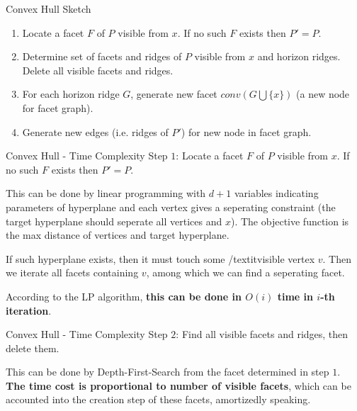 \documentclass{beamer}
\begin{document}
\begin{frame}{Convex Hull Sketch}
	\begin{enumerate}
		\item Locate a facet $F$ of $P$ visible from $x$. If no such $F$ exists then $P' = P$.
		\item Determine set of facets and ridges of $P$ visible from $x$ and horizon ridges.
		      Delete all visible facets and ridges.
		\item For each horizon ridge $G$, generate new facet $conv(G \bigcup \{ x \})$ (a new node for facet graph).
		\item Generate new edges (i.e. ridges of $P'$) for new node in facet graph.
	\end{enumerate}
\end{frame}
\begin{frame}{Convex Hull - Time Complexity}
	Step $1$: Locate a facet $F$ of $P$ visible from $x$. If no such $F$ exists then $P' = P$.

	\vspace{\baselineskip}

	This can be done by linear programming with $d + 1$ variables indicating parameters of hyperplane and
	each vertex gives a seperating constraint (the target hyperplane should seperate all vertices and $x$).
	The objective function is the max distance of vertices and target hyperplane.

	\vspace{\baselineskip}

	If such hyperplane exists, then it must touch some /textit{visible} vertex $v$.
	Then we iterate all facets containing $v$, among which we can find a seperating facet.

	\vspace{\baselineskip}

	According to the LP algorithm, \textbf{this can be done in $O(i)$ time in $i$-th iteration}.
\end{frame}
\begin{frame}{Convex Hull - Time Complexity}
	Step $2$: Find all visible facets and ridges, then delete them.

	\vspace{\baselineskip}

	This can be done by Depth-First-Search from the facet determined in step $1$.
	\textbf{The time cost is proportional to number of visible facets}, which can be accounted
	into the creation step of these facets, amortizedly speaking.
\end{frame}
\end{document}
